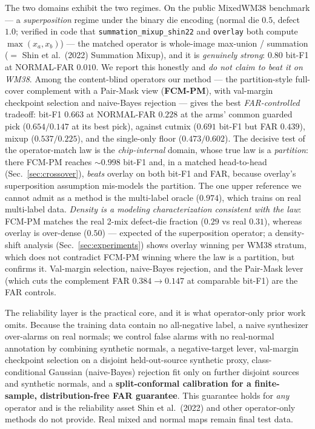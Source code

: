 \documentclass[11pt]{article}
\begin{document}
The two domains exhibit the two regimes. On the public MixedWM38 benchmark --- a
\emph{superposition} regime under the binary die encoding (normal die $0.5$, defect
$1.0$; verified in code that \texttt{summation\_mixup\_shin22} and \texttt{overlay}
both compute $\max(x_a,x_b)$) --- the matched operator is whole-image max-union /
summation ($=$ Shin et al.\ (2022) Summation Mixup), and it is \emph{genuinely strong}:
$0.80$ bit-F1 at NORMAL-FAR $0.010$. We report this honestly and \emph{do not claim to
beat it on WM38}. Among the content-blind operators our method --- the partition-style
full-cover complement with a Pair-Mask view (\textbf{FCM-PM}), with val-margin
checkpoint selection and naive-Bayes rejection --- gives the best \emph{FAR-controlled}
tradeoff: bit-F1 $0.663$ at NORMAL-FAR $0.228$ at the arms' common guarded pick
($0.654/0.147$ at its best pick), against cutmix ($0.691$ bit-F1 but FAR $0.439$),
mixup ($0.537/0.225$), and the single-only floor ($0.473/0.602$). The decisive test of
the operator-match law is the \emph{chip-internal} domain, whose true law is a
\emph{partition}: there FCM-PM reaches ${\sim}0.998$ bit-F1 and, in a matched
head-to-head (Sec.~\ref{sec:crossover}), \emph{beats} overlay on both bit-F1 and FAR,
because overlay's superposition assumption mis-models the partition. The one upper
reference we cannot admit as a method is the multi-label oracle ($0.974$), which trains
on real multi-label data. \emph{Density is a modeling characterization consistent with
the law}: FCM-PM matches the real 2-mix defect-die fraction ($0.29$ vs real $0.31$),
whereas overlay is over-dense ($0.50$) --- expected of the superposition operator; a
density-shift analysis (Sec.~\ref{sec:experiments}) shows overlay winning per WM38
stratum, which does not contradict FCM-PM winning where the law is a partition, but
confirms it. Val-margin selection, naive-Bayes rejection, and the Pair-Mask lever
(which cuts the complement FAR $0.384\to0.147$ at comparable bit-F1) are the FAR
controls.

The reliability layer is the practical core, and it is what operator-only prior
work omits. Because the training data contain no all-negative label, a naive
synthesizer over-alarms on real normals; we control false alarms with no
real-normal annotation by combining synthetic normals, a negative-target lever,
val-margin checkpoint selection on a disjoint held-out-source synthetic proxy,
class-conditional Gaussian (naive-Bayes) rejection fit only on further disjoint
sources and synthetic normals, and a \textbf{split-conformal calibration for a
finite-sample, distribution-free FAR guarantee}. This guarantee holds for
\emph{any} operator and is the reliability asset Shin et al.\ (2022) and other
operator-only methods do not provide. Real mixed and normal maps remain final test
data.
\end{document}
